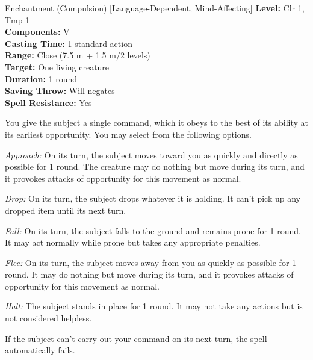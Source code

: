 {Enchantment (Compulsion) [Language-Dependent, Mind-Affecting]}
{
	\textbf{Level:}
	Clr 1, Tmp 1\\
	\textbf{Components:}
	V\\
	\textbf{Casting Time:}
	1 standard action\\
	\textbf{Range:}
	Close (7.5 m + 1.5 m/2 levels)\\
	\textbf{Target:}
	One living creature\\
	\textbf{Duration:}
	1 round\\
	\textbf{Saving Throw:}
	Will negates\\
	\textbf{Spell Resistance:}
	Yes\\
}
{
	You give the subject a single command, which it obeys to the best of its ability at its earliest opportunity. You may select from the following options.

	\textit{Approach:}
	On its turn, the subject moves toward you as quickly and directly as possible for 1 round. The creature may do nothing but move during its turn, and it provokes attacks of opportunity for this movement as normal.

	\textit{Drop:}
	On its turn, the subject drops whatever it is holding. It can't pick up any dropped item until its next turn.

	\textit{Fall:}
	On its turn, the subject falls to the ground and remains prone for 1 round. It may act normally while prone but takes any appropriate penalties.

	\textit{Flee:}
	On its turn, the subject moves away from you as quickly as possible for 1 round. It may do nothing but move during its turn, and it provokes attacks of opportunity for this movement as normal.

	\textit{Halt:}
	The subject stands in place for 1 round. It may not take any actions but is not considered helpless.

	If the subject can't carry out your command on its next turn, the spell automatically fails.

}
